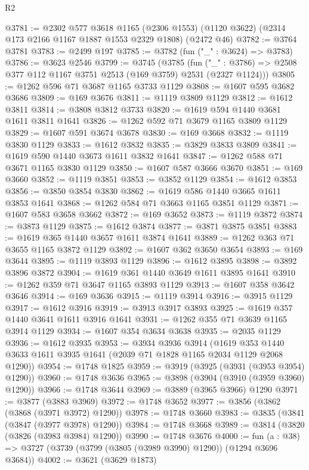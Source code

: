 \begin{lexlean}{R2}
\begin{coremodule}
@3781 := @2302
    @577
    @3618
    @1165
    (@2306 @1553)
    (@1120 @3622)
    (@2314 @173 @2166 @1167 @1887 @1553 @2329 @1808)
    (@2472 @46)
@3782 := @3764 @3781
@3783 := @2499 @197
@3785 := @3782 (fun ("_" : @3624) => @3783)
@3786 := @3623 @2546
@3799 := @3745
    (@3785
      (fun ("_" : @3786) => @2508 @377 @112 @1167 @3751 @2513 (@169 @3759) @2531 (@2327 @1124)))
@3805 := @1262 @596 @71 @3687 @1165 @3733 @1129
@3808 := @1607 @595 @3682 @3686
@3809 := @169 @3676
@3811 := @1119 @3809 @1129
@3812 := @1612 @3811
@3814 := @3808 @3812 @3733
@3820 := @1619 @594 @1440 @3681 @1611 @3811 @1641
@3826 := @1262 @592 @71 @3679 @1165 @3809 @1129
@3829 := @1607 @591 @3674 @3678
@3830 := @169 @3668
@3832 := @1119 @3830 @1129
@3833 := @1612 @3832
@3835 := @3829 @3833 @3809
@3841 := @1619 @590 @1440 @3673 @1611 @3832 @1641
@3847 := @1262 @588 @71 @3671 @1165 @3830 @1129
@3850 := @1607 @587 @3666 @3670
@3851 := @169 @3660
@3852 := @1119 @3851
@3853 := @3852 @1129
@3854 := @1612 @3853
@3856 := @3850 @3854 @3830
@3862 := @1619 @586 @1440 @3665 @1611 @3853 @1641
@3868 := @1262 @584 @71 @3663 @1165 @3851 @1129
@3871 := @1607 @583 @3658 @3662
@3872 := @169 @3652
@3873 := @1119 @3872
@3874 := @3873 @1129
@3875 := @1612 @3874
@3877 := @3871 @3875 @3851
@3883 := @1619 @365 @1440 @3657 @1611 @3874 @1641
@3889 := @1262 @363 @71 @3655 @1165 @3872 @1129
@3892 := @1607 @362 @3650 @3654
@3893 := @169 @3644
@3895 := @1119 @3893 @1129
@3896 := @1612 @3895
@3898 := @3892 @3896 @3872
@3904 := @1619 @361 @1440 @3649 @1611 @3895 @1641
@3910 := @1262 @359 @71 @3647 @1165 @3893 @1129
@3913 := @1607 @358 @3642 @3646
@3914 := @169 @3636
@3915 := @1119 @3914
@3916 := @3915 @1129
@3917 := @1612 @3916
@3919 := @3913 @3917 @3893
@3925 := @1619 @357 @1440 @3641 @1611 @3916 @1641
@3931 := @1262 @355 @71 @3639 @1165 @3914 @1129
@3934 := @1607 @354 @3634 @3638
@3935 := @2035 @1129
@3936 := @1612 @3935
@3953 := @3934
    @3936
    @3914
    (@1619 @353 @1440 @3633 @1611 @3935 @1641 (@2039 @71 @1828 @1165 @2034 @1129 @2068 @1290))
@3954 := @1748 @1825
@3959 := @3919 (@3925 (@3931 (@3953 @3954) @1290))
@3960 := @1748 @3636
@3965 := @3898 (@3904 (@3910 (@3959 @3960) @1290))
@3966 := @1748 @3644
@3969 := @3889 (@3965 @3966) @1290
@3971 := @3877 (@3883 @3969)
@3972 := @1748 @3652
@3977 := @3856 (@3862 (@3868 (@3971 @3972) @1290))
@3978 := @1748 @3660
@3983 := @3835 (@3841 (@3847 (@3977 @3978) @1290))
@3984 := @1748 @3668
@3989 := @3814 (@3820 (@3826 (@3983 @3984) @1290))
@3990 := @1748 @3676
@4000 := fun (a : @38) => @3727 (@3739 (@3799 (@3805 (@3989 @3990) @1290)) (@1294 @3696 @3684))
@4002 := @3621 (@3629 @1873)

\end{coremodule}
\end{lexlean}
